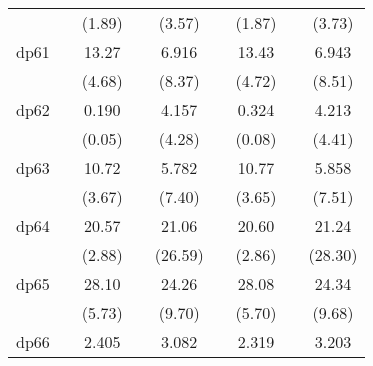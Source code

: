 {\begin{tabular}{l*{8}{c}}
            &                     &      (1.89)         &                     &      (3.57)         &                     &      (1.87)         &                     &      (3.73)         \\
[1em]
dp61        &                     &       13.27\sym{***}&                     &       6.916\sym{***}&                     &       13.43\sym{***}&                     &       6.943\sym{***}\\
            &                     &      (4.68)         &                     &      (8.37)         &                     &      (4.72)         &                     &      (8.51)         \\
[1em]
dp62        &                     &       0.190         &                     &       4.157\sym{***}&                     &       0.324         &                     &       4.213\sym{***}\\
            &                     &      (0.05)         &                     &      (4.28)         &                     &      (0.08)         &                     &      (4.41)         \\
[1em]
dp63        &                     &       10.72\sym{***}&                     &       5.782\sym{***}&                     &       10.77\sym{***}&                     &       5.858\sym{***}\\
            &                     &      (3.67)         &                     &      (7.40)         &                     &      (3.65)         &                     &      (7.51)         \\
[1em]
dp64        &                     &       20.57\sym{**} &                     &       21.06\sym{***}&                     &       20.60\sym{**} &                     &       21.24\sym{***}\\
            &                     &      (2.88)         &                     &     (26.59)         &                     &      (2.86)         &                     &     (28.30)         \\
[1em]
dp65        &                     &       28.10\sym{***}&                     &       24.26\sym{***}&                     &       28.08\sym{***}&                     &       24.34\sym{***}\\
            &                     &      (5.73)         &                     &      (9.70)         &                     &      (5.70)         &                     &      (9.68)         \\
[1em]
dp66        &                     &       2.405         &                     &       3.082\sym{***}&                     &       2.319         &                     &       3.203\sym{***}\\

\end{tabular}}
